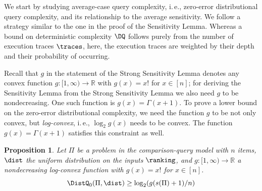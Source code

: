 \documentclass[11pt]{article}
\numberwithin{equation}{section}
\newtheorem{proposition}[theorem]{Proposition}
\theoremstyle{definition}
\theoremstyle{plain}
\newcommand{\ie}{i.\,e.}
\begin{document}
We start by studying average-case query complexity, \ie, zero-error distributional query complexity, and its relationship to the average sensitivity. We follow a strategy similar to the one in the proof of the Sensitivity Lemma. Whereas a bound on deterministic complexity $\DQ$ follows purely from the number of execution traces $\traces$, here, the execution traces are weighted by their depth and their probability of occurring.

Recall that $g$ in the statement of the Strong Sensitivity Lemma denotes any convex function $g: [1,\infty) \to \mathbb{R}$ with $g(x) = x!$ for $x \in [n]$; for deriving the Sensitivity Lemma from the Strong Sensitivity Lemma we also need $g$ to be nondecreasing. One such function is $g(x) = \Gamma(x+1)$. To prove a lower bound on the zero-error distributional complexity, we need the function $g$ to be not only convex, but \emph{log-convex}, \ie, $\log_2 g(x)$ needs to be convex. The function $g(x) = \Gamma(x+1)$ satisfies this constraint as well.

\begin{proposition}
	\label{claim:sensitivity:average}
Let $\Pi$ be a problem in the comparison-query model with $n$ items, $\dist$ the uniform distribution on the inputs $\ranking$, and $g: [1,\infty) \to \mathbb{R}$ a nondecreasing log-convex function with $g(x) = x!$ for $x \in [n]$.
\[\DistQ_0(\Pi,\dist)\ge \log_2 (g(s(\Pi)+1)/n) \]
\end{proposition}
\end{document}
